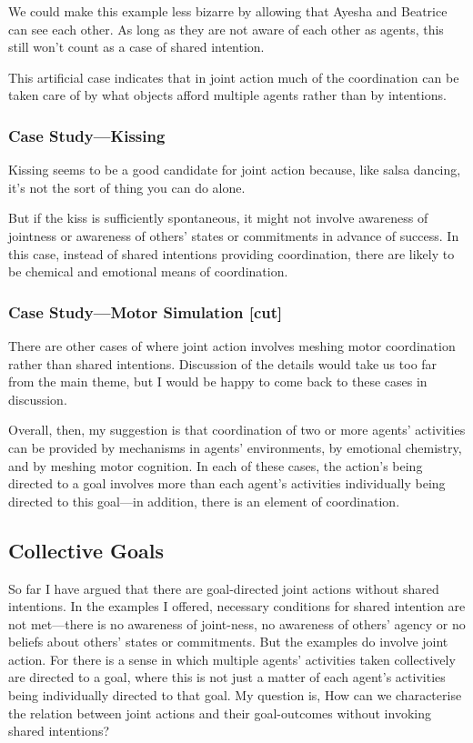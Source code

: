 \documentclass[12pt,a4paper]{extarticle}
\begin{document}
We could make this example less bizarre by allowing that Ayesha and Beatrice can see each other.  As long as they are not aware of each other as agents, this still won't count as a case of shared intention.  

This artificial case indicates that in joint action much of the coordination can be taken care of by what objects afford multiple agents rather than by intentions. 



\subsubsection{Case Study---Kissing}
Kissing seems to be a good candidate for joint action because, like salsa dancing, it's not the sort of thing you can do alone.

But if the kiss is sufficiently spontaneous, it might not involve awareness of jointness or awareness of others' states or commitments in advance of success.  In this case, instead of shared intentions providing coordination, there are likely to be chemical and emotional means of coordination.



\subsubsection{Case Study---Motor Simulation [cut]}

There are other cases of where joint action involves meshing motor coordination rather than shared intentions.  Discussion of the details would take us too far from the main theme, but I would be happy to come back to these cases in discussion.

Overall, then, my suggestion is that coordination of two or more agents' activities can be provided by mechanisms in agents' environments, by emotional chemistry, and by meshing motor cognition.  
In each of these cases, the action's being directed to a goal involves more than each agent's activities individually being directed to this goal---in addition, there is an element of coordination.



\subsection{Collective Goals}
\label{section_collective}

So far I have argued that there are goal-directed joint actions without shared intentions.  
In the examples I offered, necessary conditions for shared intention are not met---there is no awareness of joint-ness, no awareness of others' agency or no beliefs about others' states or commitments.  But the examples do involve joint action.  For there is a sense in which multiple agents' activities taken collectively are directed to a goal, where this is not just a matter of each agent's activities being individually directed to that goal.
My question is, How can we characterise the relation between joint actions and their goal-outcomes without invoking shared intentions?  
\end{document}
